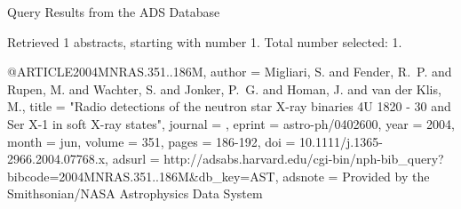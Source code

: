 Query Results from the ADS Database


Retrieved 1 abstracts, starting with number 1.  Total number selected: 1.

@ARTICLE{2004MNRAS.351..186M,
   author = {{Migliari}, S. and {Fender}, R.~P. and {Rupen}, M. and {Wachter}, S. and 
	{Jonker}, P.~G. and {Homan}, J. and {van der Klis}, M.},
    title = "{Radio detections of the neutron star X-ray binaries 4U 1820 - 30 and Ser X-1 in soft X-ray states}",
  journal = {\mnras},
   eprint = {astro-ph/0402600},
     year = 2004,
    month = jun,
   volume = 351,
    pages = {186-192},
      doi = {10.1111/j.1365-2966.2004.07768.x},
   adsurl = {http://adsabs.harvard.edu/cgi-bin/nph-bib_query?bibcode=2004MNRAS.351..186M&db_key=AST},
  adsnote = {Provided by the Smithsonian/NASA Astrophysics Data System}
}


